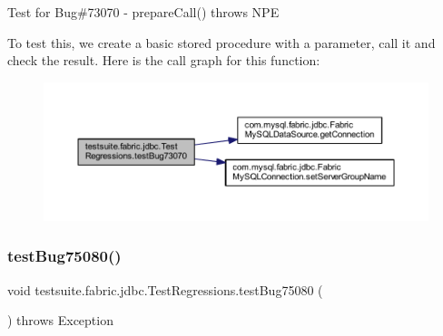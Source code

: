 Test for Bug\#73070 -\/ prepare\+Call() throws N\+PE

To test this, we create a basic stored procedure with a parameter, call it and check the result. Here is the call graph for this function\+:
\nopagebreak
\begin{figure}[H]
\begin{center}
\leavevmode
\includegraphics[width=350pt]{classtestsuite_1_1fabric_1_1jdbc_1_1_test_regressions_a62bab22c5e479b7c4f07339b0085a73a_cgraph}
\end{center}
\end{figure}
\mbox{\label{classtestsuite_1_1fabric_1_1jdbc_1_1_test_regressions_a4e0d710d5707438a3ccd2dde61938f1c}} 
\subsubsection{\texorpdfstring{test\+Bug75080()}{testBug75080()}}
{\footnotesize\ttfamily void testsuite.\+fabric.\+jdbc.\+Test\+Regressions.\+test\+Bug75080 (\begin{DoxyParamCaption}{ }\end{DoxyParamCaption}) throws Exception}

